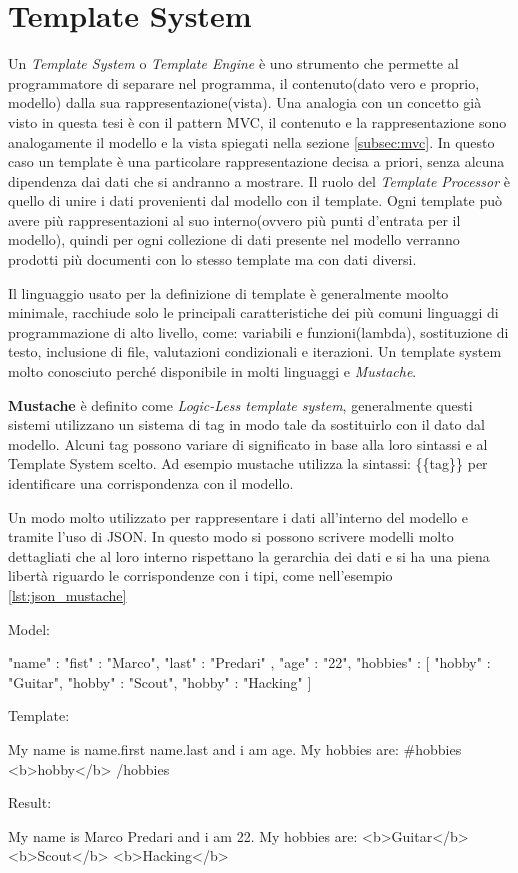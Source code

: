 \section{Template System}

Un \textit{Template System} o \textit{Template Engine} è uno strumento che permette al programmatore di separare nel programma, il contenuto(dato vero e proprio, modello) dalla sua rappresentazione(vista). Una analogia con un concetto già visto in questa tesi è con il pattern MVC, il contenuto e la rappresentazione sono analogamente il modello e la vista spiegati nella sezione \ref{subsec:mvc}.
In questo caso un template è una particolare rappresentazione decisa a priori, senza alcuna dipendenza dai dati che si andranno a mostrare. Il ruolo del \emph{Template Processor} è quello di unire i dati provenienti dal modello con il template. Ogni template può avere più rappresentazioni al suo interno(ovvero più punti d'entrata per il modello), quindi per ogni collezione di dati presente nel modello verranno prodotti più documenti con lo stesso template ma con dati diversi.

Il linguaggio usato per la definizione di template è generalmente moolto minimale, racchiude solo le principali caratteristiche dei più comuni linguaggi di programmazione di alto livello, come: variabili e funzioni(lambda), sostituzione di testo, inclusione di file, valutazioni condizionali e iterazioni.
Un template system molto conosciuto perché disponibile in molti linguaggi e \textit{Mustache}.

\textbf{Mustache} è definito come \emph{Logic-Less template system}, generalmente questi sistemi utilizzano un sistema di tag in modo tale da sostituirlo con il dato dal modello. Alcuni tag possono variare di significato in base alla loro sintassi e al Template System scelto. Ad esempio mustache utilizza la sintassi: \{\{tag\}\} per identificare una corrispondenza con il modello.

Un modo molto utilizzato per rappresentare i dati all'interno del modello e tramite l'uso di JSON. In questo modo si possono scrivere modelli molto dettagliati che al loro interno rispettano la gerarchia dei dati e si ha una piena libertà riguardo le corrispondenze con i tipi, come nell'esempio \ref{lst:json_mustache}

\begin{code}[label = {lst:json_mustache}, caption = {Un esempio di modello in json: la sua corrispondeza con il template system mustache e il risultato che si ottiene}]

Model:

{
	"name" : {
		"fist" : "Marco",
	 	"last" : "Predari"
	},
	"age" : "22",
	"hobbies" : [
		{"hobby" : "Guitar"},
		{"hobby" : "Scout"},
		{"hobby" : "Hacking"}
	]
}

Template:

My name is {{name.first}} {{name.last}} and i am {{age}}.
My hobbies are:
{{#hobbies}}
<b>{{hobby}}</b>
{{/hobbies}}

Result:

My name is Marco Predari and i am 22.
My hobbies are:
	<b>Guitar</b>
	<b>Scout</b>
	<b>Hacking</b>
\end{code}

